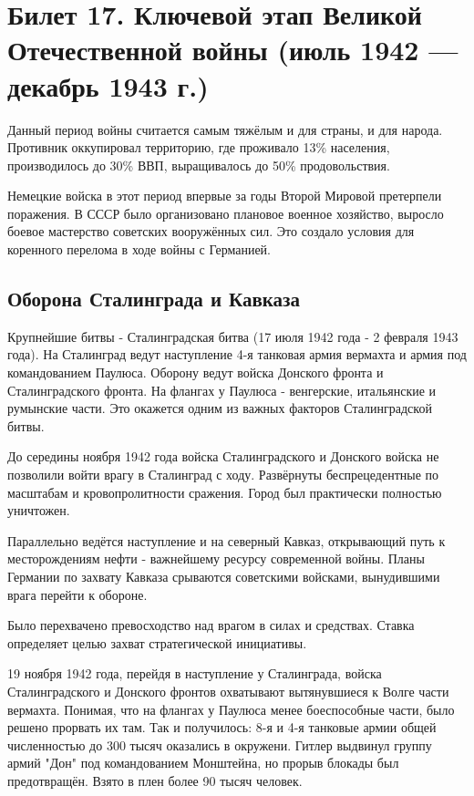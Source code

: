 \section{Билет 17. Ключевой этап Великой Отечественной войны (июль 1942 — декабрь 1943 г.)}

Данный период войны считается самым тяжёлым и для страны, и для народа.
Противник оккупировал территорию, где проживало 13\% населения, производилось до 30\% ВВП, выращивалось до 50\% продовольствия.

Немецкие войска в этот период впервые за годы Второй Мировой претерпели поражения.
В СССР было организовано плановое военное хозяйство, выросло боевое мастерство советских вооружённых сил. Это создало условия для коренного перелома в ходе войны с Германией.

\subsection{Оборона Сталинграда и Кавказа}

Крупнейшие битвы - Сталинградская битва (17 июля 1942 года - 2 февраля 1943 года). На Сталинград ведут наступление 4-я танковая армия вермахта и армия под командованием Паулюса. Оборону ведут войска Донского фронта и Сталинградского фронта.
На флангах у Паулюса - венгерские, итальянские и румынские части. Это окажется одним из важных факторов Сталинградской битвы.

До середины ноября 1942 года войска Сталинградского и Донского войска не позволили войти врагу в Сталинград с ходу. Развёрнуты беспрецедентные по масштабам и кровопролитности сражения. Город был практически полностью уничтожен.

Параллельно ведётся наступление и на северный Кавказ, открывающий путь к месторождениям нефти - важнейшему ресурсу современной войны. Планы Германии по захвату Кавказа срываются советскими войсками, вынудившими врага перейти к обороне.

Было перехвачено превосходство над врагом в силах и средствах. Ставка определяет целью захват стратегической инициативы.

19 ноября 1942 года, перейдя в наступление у Сталинграда, войска Сталинградского и Донского фронтов охватывают вытянувшиеся к Волге части вермахта. Понимая, что на флангах у Паулюса менее боеспособные части, было решено прорвать их там. Так и получилось: 8-я и 4-я танковые армии общей численностью до 300 тысяч оказались в окружени. Гитлер выдвинул группу армий "Дон" под командованием Монштейна, но прорыв блокады был предотвращён. Взято в плен более 90 тысяч человек.

